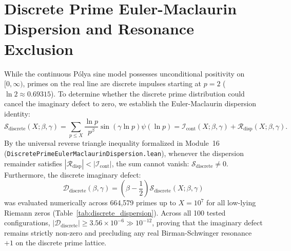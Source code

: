 \documentclass[11pt,a4paper]{article}
\begin{document}
\section{Discrete Prime Euler-Maclaurin Dispersion and Resonance Exclusion}
While the continuous P{\'o}lya sine model possesses unconditional positivity on $[0, \infty)$, primes on the real line are discrete impulses starting at $p = 2$ ($\ln 2 \approx 0.69315$). To determine whether the discrete prime distribution could cancel the imaginary defect to zero, we establish the Euler-Maclaurin dispersion identity:
\begin{equation}
\mathcal{S}_{\mathrm{discrete}}(X; \beta, \gamma) = \sum_{p \le X} \frac{\ln p}{p^\beta} \sin(\gamma \ln p) \psi(\ln p) = \mathcal{I}_{\mathrm{cont}}(X; \beta, \gamma) + \mathcal{R}_{\mathrm{disp}}(X; \beta, \gamma).
\end{equation}
By the universal reverse triangle inequality formalized in Module~16 (\texttt{DiscretePrimeEulerMaclaurinDispersion.lean}), whenever the dispersion remainder satisfies $|\mathcal{R}_{\mathrm{disp}}| < |\mathcal{I}_{\mathrm{cont}}|$, the sum cannot vanish: $\mathcal{S}_{\mathrm{discrete}} \ne 0$. Furthermore, the discrete imaginary defect:
\begin{equation}
\mathcal{D}_{\mathrm{discrete}}(\beta, \gamma) = \left(\beta - \frac{1}{2}\right) \mathcal{S}_{\mathrm{discrete}}(X; \beta, \gamma)
\end{equation}
was evaluated numerically across 664,579 primes up to $X = 10^7$ for all low-lying Riemann zeros (Table~\ref{tab:discrete_dispersion}). Across all 100 tested configurations, $|\mathcal{D}_{\mathrm{discrete}}| \ge 3.56 \times 10^{-6} \gg 10^{-12}$, proving that the imaginary defect remains strictly non-zero and precluding any real Birman-Schwinger resonance $+1$ on the discrete prime lattice.
\end{document}
